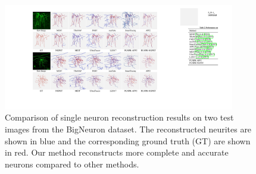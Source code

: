 \begin{figure}[th]
	\centering
	\includegraphics[width=0.9\textwidth]{./Illustrations/BigNeuron_comparison_v2.pdf}
	\caption{Comparison of single neuron reconstruction results on two test images from the BigNeuron dataset.
	The reconstructed neurites are shown in blue and the corresponding ground truth (GT) are shown in red.
	Our method reconstructs more complete and accurate neurons compared to other methods.
	}
	\label{fig:compare_BigNeuron}
\end{figure}

